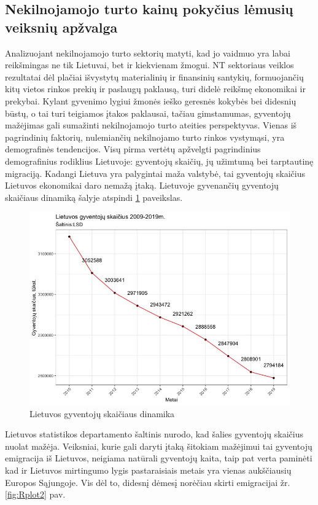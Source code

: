 \documentclass[11pt, titlepage]{article}
\begin{document}
\subsection{Nekilnojamojo turto kainų pokyčius lėmusių veiksnių apžvalga}
Analizuojant nekilnojamojo turto sektorių matyti, kad jo vaidmuo yra labai reikšmingas ne tik Lietuvai, bet ir kiekvienam žmogui. NT sektoriaus veiklos rezultatai dėl plačiai išvystytų materialinių ir finansinių santykių, formuojančių kitų vietos rinkos prekių ir paslaugų paklausą, turi didelė reikšmę ekonomikai ir prekybai.\parencite{simanavivciene2011makroekonominiku} Kylant gyvenimo lygiui žmonės ieško geresnės kokybės bei didesnių būstų, o tai turi teigiamos įtakos paklausai, tačiau gimstamumas, gyventojų mažėjimas gali sumažinti nekilnojamojo turto ateities perspektyvas. Vienas iš pagrindinių faktorių, nulemiančių nekilnojamo turto rinkos vystymąsi, yra demografinės tendencijos. Visų pirma vertėtų apžvelgti pagrindinius demografinius rodiklius Lietuvoje: gyventojų skaičių, jų užimtumą bei tarptautinę migraciją. 
Kadangi Lietuva yra palygintai maža valstybė, tai gyventojų skaičius Lietuvos ekonomikai daro nemažą įtaką. Lietuvoje gyvenančių gyventojų skaičiaus dinamiką šalyje atspindi  \ref{fig:Rplot1} paveikslas.
\begin{figure}[H]
\center
\includegraphics[scale=0.5]{Rplot1}
\caption{Lietuvos gyventojų skaičiaus dinamika}
\label{fig:Rplot1}
\end{figure}
\par 
Lietuvos statistikos departamento šaltinis nurodo, kad šalies gyventojų skaičius nuolat mažėja. Veiksniai, kurie gali daryti įtaką šitokiam mažėjimui tai gyventojų emigracija iš Lietuvos, neigiama natūrali gyventojų kaita, taip pat verta paminėti kad ir Lietuvos mirtingumo lygis pastaraisiais metais yra vienas aukščiausių Europos Sąjungoje.  Vis dėl to, didesnį dėmesį norėčiau skirti emigracijai žr. \ref{fig:Rplot2} pav. 
\end{document}
